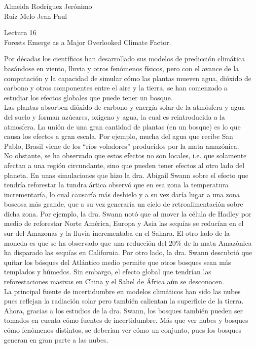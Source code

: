 \documentclass[a4paper, 12pt]{report}
\begin{document}
\begin{flushright}
    Almeida Rodríguez Jerónimo\\
    Ruiz Melo Jean Paul
\end{flushright}

\begin{center}
    {\LARGE Lectura 16}\\
    {\LARGE Forests Emerge as a Major Overlooked Climate Factor.}
\end{center}

Por décadas los científicos han desarrollado sus modelos de predicción climática
basándose en viento, lluvia y otros fenómenos físicos, pero con el avance de la
computación y la capacidad de simular cómo las plantas mueven agua, dióxido
de carbono y otros componentes entre el aire y la tierra, se han comenzado a
estudiar los efectos globales que puede tener un bosque.\\

Las plantas absorben dióxido de carbono y energía solar de la atmósfera y agua
del suelo y forman azúcares, oxigeno y agua, la cual es reintroducida a la
atmosfera. La unión de una gran cantidad de plantas (en un bosque) es lo que
causa los efectos a gran escala. Por ejemplo, mucha del agua que recibe San
Pablo, Brasil viene de los ``ríos voladores'' producidos por la mata
amazónica.\\

No obstante, se ha observado que estos efectos no son locales, i.e. que
solamente afectan a una región circundante, sino que pueden tener efectos al
otro lado del planeta. En unas simulaciones que hizo la dra. Abigail Swann sobre
el efecto que tendría reforestar la tundra ártica observó que en esa zona la
temperatura incrementaría, lo cual causaría más deshielo y a su vez daría lugar
a una zona boscosa más grande, que a su vez generaría un ciclo de
retroalimentación sobre dicha zona. Por ejemplo, la dra. Swann notó que al mover
la célula de Hadley por medio de reforestar Norte América, Europa y Asia las
sequías se reducían en el sur del Amazonas y la lluvia incrementaba en el
Sahara. El otro lado de la moneda es que se ha observado que una reducción del
$20\%$ de la mata Amazónica ha disparado las sequías en California. Por otro
lado, la dra. Swann descubrió que quitar los bósques del Atlántico medio
permite que otros bosques sean más templados y húmedos. Sin embargo, el efecto
global que tendrían las reforestaciones masivas en China y el Sahel de África
aún se desconocen.\\

La principal fuente de incertidumbre en modelos climáticos han sido las nubes
pues reflejan la radiación solar pero también calientan la superficie de la
tierra. Ahora, gracias a los estudios de la dra. Swann, los bosques también
pueden ser tomados en cuenta cómo fuentes de incertidumbre. Más que ver nubes y
bosques cómo fenómenos distintos, se deberían ver cómo un conjunto, pues los
bosques generan en gran parte a las nubes.
\end{document}
